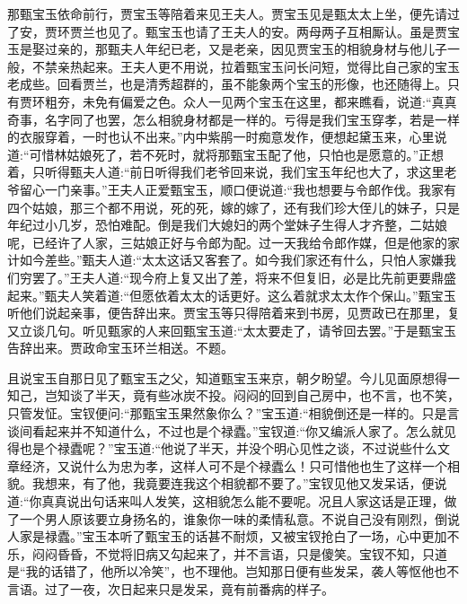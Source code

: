 \begin{parag}
    那甄宝玉依命前行，贾宝玉等陪着来见王夫人。贾宝玉见是甄太太上坐，便先请过了安，贾环贾兰也见了。甄宝玉也请了王夫人的安。两母两子互相厮认。虽是贾宝玉是娶过亲的，那甄夫人年纪已老，又是老亲，因见贾宝玉的相貌身材与他儿子一般，不禁亲热起来。王夫人更不用说，拉着甄宝玉问长问短，觉得比自己家的宝玉老成些。回看贾兰，也是清秀超群的，虽不能象两个宝玉的形像，也还随得上。只有贾环粗夯，未免有偏爱之色。众人一见两个宝玉在这里，都来瞧看，说道:“真真奇事，名字同了也罢，怎么相貌身材都是一样的。亏得是我们宝玉穿孝，若是一样的衣服穿着，一时也认不出来。”内中紫鹃一时痴意发作，便想起黛玉来，心里说道:“可惜林姑娘死了，若不死时，就将那甄宝玉配了他，只怕也是愿意的。”正想着，只听得甄夫人道:“前日听得我们老爷回来说，我们宝玉年纪也大了，求这里老爷留心一门亲事。”王夫人正爱甄宝玉，顺口便说道:“我也想要与令郎作伐。我家有四个姑娘，那三个都不用说，死的死，嫁的嫁了，还有我们珍大侄儿的妹子，只是年纪过小几岁，恐怕难配。倒是我们大媳妇的两个堂妹子生得人才齐整，二姑娘呢，已经许了人家，三姑娘正好与令郎为配。过一天我给令郎作媒，但是他家的家计如今差些。”甄夫人道:“太太这话又客套了。如今我们家还有什么，只怕人家嫌我们穷罢了。”王夫人道:“现今府上复又出了差，将来不但复旧，必是比先前更要鼎盛起来。”甄夫人笑着道:“但愿依着太太的话更好。这么着就求太太作个保山。”甄宝玉听他们说起亲事，便告辞出来。贾宝玉等只得陪着来到书房，见贾政已在那里，复又立谈几句。听见甄家的人来回甄宝玉道:“太太要走了，请爷回去罢。”于是甄宝玉告辞出来。贾政命宝玉环兰相送。不题。
\end{parag}


\begin{parag}
    且说宝玉自那日见了甄宝玉之父，知道甄宝玉来京，朝夕盼望。今儿见面原想得一知己，岂知谈了半天，竟有些冰炭不投。闷闷的回到自己房中，也不言，也不笑，只管发怔。宝钗便问:“那甄宝玉果然象你么？”宝玉道:“相貌倒还是一样的。只是言谈间看起来并不知道什么，不过也是个禄蠹。”宝钗道:“你又编派人家了。怎么就见得也是个禄蠹呢？”宝玉道:“他说了半天，并没个明心见性之谈，不过说些什么文章经济，又说什么为忠为孝，这样人可不是个禄蠹么！只可惜他也生了这样一个相貌。我想来，有了他，我竟要连我这个相貌都不要了。”宝钗见他又发呆话，便说道:“你真真说出句话来叫人发笑，这相貌怎么能不要呢。况且人家这话是正理，做了一个男人原该要立身扬名的，谁象你一味的柔情私意。不说自己没有刚烈，倒说人家是禄蠹。”宝玉本听了甄宝玉的话甚不耐烦，又被宝钗抢白了一场，心中更加不乐，闷闷昏昏，不觉将旧病又勾起来了，并不言语，只是傻笑。宝钗不知，只道是“我的话错了，他所以冷笑”，也不理他。岂知那日便有些发呆，袭人等怄他也不言语。过了一夜，次日起来只是发呆，竟有前番病的样子。
\end{parag}



